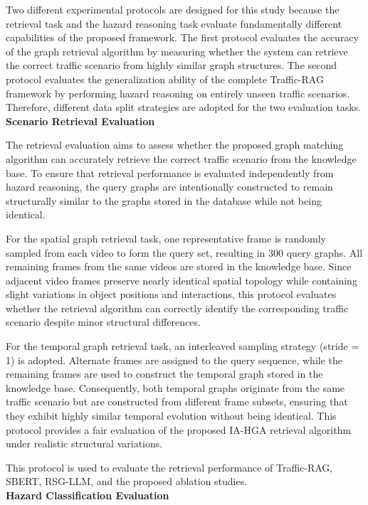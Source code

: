 \documentclass[a4paper, 11pt]{article} %
\begin{document}
Two different experimental protocols are designed for this study because the retrieval task and the hazard reasoning task evaluate fundamentally different capabilities of the proposed framework. The first protocol evaluates the accuracy of the graph retrieval algorithm by measuring whether the system can retrieve the correct traffic scenario from highly similar graph structures. The second protocol evaluates the generalization ability of the complete Traffic-RAG framework by performing hazard reasoning on entirely unseen traffic scenarios. Therefore, different data split strategies are adopted for the two evaluation tasks.
\\
\textbf{Scenario Retrieval Evaluation}

The retrieval evaluation aims to assess whether the proposed graph matching algorithm can accurately retrieve the correct traffic scenario from the knowledge base. To ensure that retrieval performance is evaluated independently from hazard reasoning, the query graphs are intentionally constructed to remain structurally similar to the graphs stored in the database while not being identical.

For the spatial graph retrieval task, one representative frame is randomly sampled from each video to form the query set, resulting in 300 query graphs. All remaining frames from the same videos are stored in the knowledge base. Since adjacent video frames preserve nearly identical spatial topology while containing slight variations in object positions and interactions, this protocol evaluates whether the retrieval algorithm can correctly identify the corresponding traffic scenario despite minor structural differences.

For the temporal graph retrieval task, an interleaved sampling strategy (stride = 1) is adopted. Alternate frames are assigned to the query sequence, while the remaining frames are used to construct the temporal graph stored in the knowledge base. Consequently, both temporal graphs originate from the same traffic scenario but are constructed from different frame subsets, ensuring that they exhibit highly similar temporal evolution without being identical. This protocol provides a fair evaluation of the proposed IA-HGA retrieval algorithm under realistic structural variations.

This protocol is used to evaluate the retrieval performance of Traffic-RAG, SBERT, RSG-LLM, and the proposed ablation studies.
\\
\textbf{Hazard Classification Evaluation}
\end{document}
